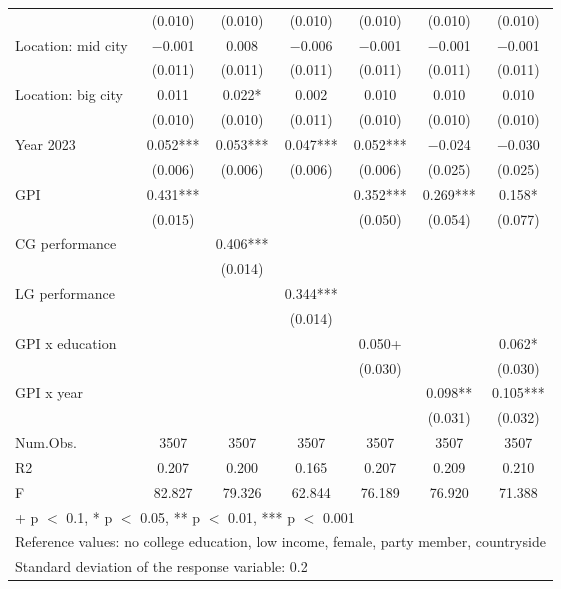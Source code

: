 \documentclass[
  number]{elsarticle}
\begin{document}
\begin{table}
{\begin{tabular}[t]{lcccccc}
 & (\num{0.010}) & (\num{0.010}) & (\num{0.010}) & (\num{0.010}) & (\num{0.010}) & (\num{0.010})\\
Location: mid city & \num{-0.001} & \num{0.008} & \num{-0.006} & \num{-0.001} & \num{-0.001} & \num{-0.001}\\
 & (\num{0.011}) & (\num{0.011}) & (\num{0.011}) & (\num{0.011}) & (\num{0.011}) & (\num{0.011})\\
Location: big city & \num{0.011} & \num{0.022}* & \num{0.002} & \num{0.010} & \num{0.010} & \num{0.010}\\
 & (\num{0.010}) & (\num{0.010}) & (\num{0.011}) & (\num{0.010}) & (\num{0.010}) & (\num{0.010})\\
Year 2023 & \num{0.052}*** & \num{0.053}*** & \num{0.047}*** & \num{0.052}*** & \num{-0.024} & \num{-0.030}\\
 & (\num{0.006}) & (\num{0.006}) & (\num{0.006}) & (\num{0.006}) & (\num{0.025}) & (\num{0.025})\\
GPI & \num{0.431}*** &  &  & \num{0.352}*** & \num{0.269}*** & \num{0.158}*\\
 & (\num{0.015}) &  &  & (\num{0.050}) & (\num{0.054}) & (\num{0.077})\\
CG performance &  & \num{0.406}*** &  &  &  & \\
 &  & (\num{0.014}) &  &  &  & \\
LG performance &  &  & \num{0.344}*** &  &  & \\
 &  &  & (\num{0.014}) &  &  & \\
GPI x education &  &  &  & \num{0.050}+ &  & \num{0.062}*\\
 &  &  &  & (\num{0.030}) &  & (\num{0.030})\\
GPI x year &  &  &  &  & \num{0.098}** & \num{0.105}***\\
 &  &  &  &  & (\num{0.031}) & (\num{0.032})\\
\midrule
Num.Obs. & \num{3507} & \num{3507} & \num{3507} & \num{3507} & \num{3507} & \num{3507}\\
R2 & \num{0.207} & \num{0.200} & \num{0.165} & \num{0.207} & \num{0.209} & \num{0.210}\\
F & \num{82.827} & \num{79.326} & \num{62.844} & \num{76.189} & \num{76.920} & \num{71.388}\\
\bottomrule
\multicolumn{7}{l}{\rule{0pt}{1em}+ p $<$ 0.1, * p $<$ 0.05, ** p $<$ 0.01, *** p $<$ 0.001}\\
\multicolumn{7}{l}{\rule{0pt}{1em}Reference values: no college education, low income, female, party member, countryside}\\
\multicolumn{7}{l}{\rule{0pt}{1em}Standard deviation of the response variable:  0.2}\\
\end{tabular}

}

\end{table}%
\end{document}
